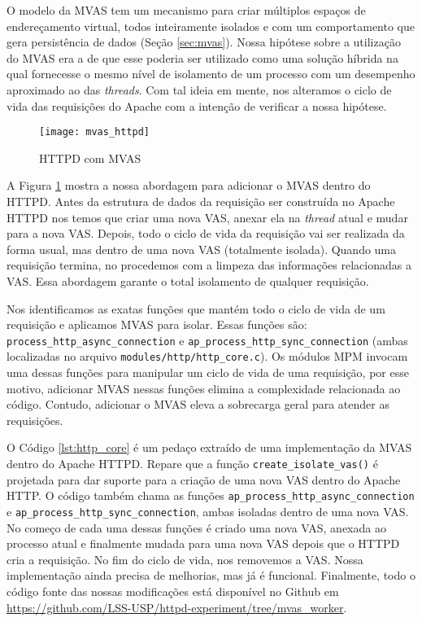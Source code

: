 O modelo da MVAS tem um mecanismo para criar múltiplos espaços de endereçamento
virtual, todos inteiramente isolados e com um comportamento que gera
persistência de dados (Seção \ref{sec:mvas}). Nossa hipótese sobre a utilização
do MVAS era a de que esse poderia ser utilizado como uma solução híbrida na
qual fornecesse o mesmo nível de isolamento de um processo com um desempenho
aproximado ao das \emph{threads}. Com tal ideia em mente, nos alteramos o ciclo
de vida das requisições do Apache com a intenção de verificar a nossa hipótese.

\begin{figure}[!h]
  \centering
  \texttt{[image: mvas\_httpd]} 
  \caption{HTTPD com MVAS}
  \label{fig:httpd_mvas} 
\end{figure}

A Figura \ref{fig:httpd_mvas} mostra a nossa abordagem para adicionar o MVAS
dentro do HTTPD. Antes da estrutura de dados da requisição ser construída no
Apache HTTPD nos temos que criar uma nova VAS, anexar ela na \emph{thread}
atual e mudar para a nova VAS. Depois, todo o ciclo de vida da requisição vai
ser realizada da forma usual, mas dentro de uma nova VAS (totalmente isolada).
Quando uma requisição termina, no procedemos com a limpeza das informações
relacionadas a VAS. Essa abordagem garante o total isolamento de qualquer
requisição.

Nos identificamos as exatas funções que mantém todo o ciclo de vida de um
requisição e aplicamos MVAS para isolar. Essas funções são:
\texttt{process\_http\_async\_connection} e
\texttt{ap\_process\_http\_sync\_connection} (ambas localizadas no arquivo
\texttt{modules/http/http\_core.c}). Os módulos MPM invocam uma dessas funções
para manipular um ciclo de vida de uma requisição, por esse motivo, adicionar
MVAS nessas funções elimina a complexidade relacionada ao código. Contudo,
adicionar o MVAS eleva a sobrecarga geral para atender as requisições.

O Código \ref{lst:http_core} é um pedaço extraído de uma implementação da MVAS
dentro do Apache HTTPD. Repare que a função \texttt{create\_isolate\_vas()} é
projetada para dar suporte para a criação de uma nova VAS dentro do Apache
HTTP. O código também chama as funções
\texttt{ap\_process\_http\_async\_connection} e
\texttt{ap\_process\_http\_sync\_connection}, ambas isoladas dentro de uma nova
VAS. No começo de cada uma dessas funções é criado uma nova VAS, anexada ao
processo atual e finalmente mudada para uma nova VAS depois que o HTTPD cria a
requisição. No fim do ciclo de vida, nos removemos a VAS. Nossa implementação
ainda precisa de melhorias, mas já é funcional. Finalmente, todo o código fonte
das nossas modificações está disponível no Github em
\url{https://github.com/LSS-USP/httpd-experiment/tree/mvas\_worker}.

